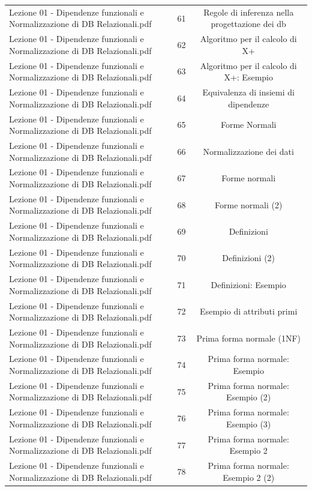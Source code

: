 \documentclass[11pt]{article}
\begin{document}
\begin{longtable}{@{}p{}cc@{}}
Lezione 01 - Dipendenze funzionali e Normalizzazione di DB Relazionali.pdf & 61 & Regole di inferenza nella progettazione dei db \\
Lezione 01 - Dipendenze funzionali e Normalizzazione di DB Relazionali.pdf & 62 & Algoritmo per il calcolo di X+ \\
Lezione 01 - Dipendenze funzionali e Normalizzazione di DB Relazionali.pdf & 63 & Algoritmo per il calcolo di X+: Esempio \\
Lezione 01 - Dipendenze funzionali e Normalizzazione di DB Relazionali.pdf & 64 & Equivalenza di insiemi di dipendenze \\
Lezione 01 - Dipendenze funzionali e Normalizzazione di DB Relazionali.pdf & 65 & Forme Normali \\
Lezione 01 - Dipendenze funzionali e Normalizzazione di DB Relazionali.pdf & 66 & Normalizzazione dei dati \\
Lezione 01 - Dipendenze funzionali e Normalizzazione di DB Relazionali.pdf & 67 & Forme normali \\
Lezione 01 - Dipendenze funzionali e Normalizzazione di DB Relazionali.pdf & 68 & Forme normali (2) \\
Lezione 01 - Dipendenze funzionali e Normalizzazione di DB Relazionali.pdf & 69 & Definizioni \\
Lezione 01 - Dipendenze funzionali e Normalizzazione di DB Relazionali.pdf & 70 & Definizioni (2) \\
Lezione 01 - Dipendenze funzionali e Normalizzazione di DB Relazionali.pdf & 71 & Definizioni: Esempio \\
Lezione 01 - Dipendenze funzionali e Normalizzazione di DB Relazionali.pdf & 72 & Esempio di attributi primi \\
Lezione 01 - Dipendenze funzionali e Normalizzazione di DB Relazionali.pdf & 73 & Prima forma normale (1NF) \\
Lezione 01 - Dipendenze funzionali e Normalizzazione di DB Relazionali.pdf & 74 & Prima forma normale: Esempio \\
Lezione 01 - Dipendenze funzionali e Normalizzazione di DB Relazionali.pdf & 75 & Prima forma normale: Esempio (2) \\
Lezione 01 - Dipendenze funzionali e Normalizzazione di DB Relazionali.pdf & 76 & Prima forma normale: Esempio (3) \\
Lezione 01 - Dipendenze funzionali e Normalizzazione di DB Relazionali.pdf & 77 & Prima forma normale: Esempio 2 \\
Lezione 01 - Dipendenze funzionali e Normalizzazione di DB Relazionali.pdf & 78 & Prima forma normale: Esempio 2 (2) \\

\end{longtable}
\end{document}
